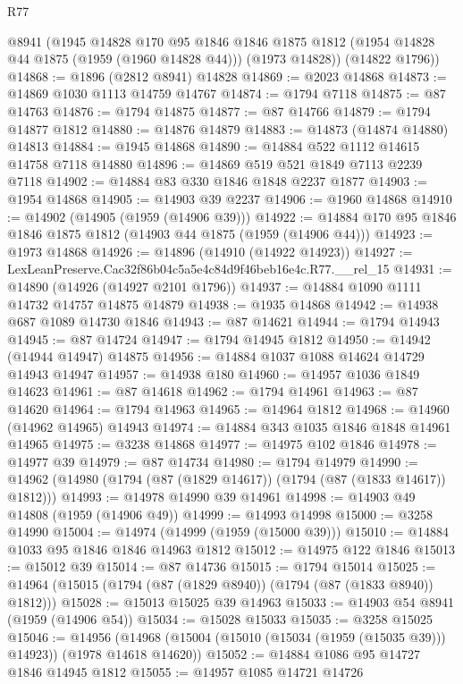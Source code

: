 \begin{lexlean}{R77}
\begin{coremodule}
      @8941
      (@1945
        @14828
        @170
        @95
        @1846
        @1846
        @1875
        @1812
        (@1954 @14828 @44 @1875 (@1959 (@1960 @14828 @44)))
        (@1973 @14828))
      (@14822 @1796))
@14868 := @1896 (@2812 @8941) @14828
@14869 := @2023 @14868
@14873 := @14869 @1030 @1113 @14759 @14767
@14874 := @1794 @7118
@14875 := @87 @14763
@14876 := @1794 @14875
@14877 := @87 @14766
@14879 := @1794 @14877 @1812
@14880 := @14876 @14879
@14883 := @14873 (@14874 @14880) @14813
@14884 := @1945 @14868
@14890 := @14884 @522 @1112 @14615 @14758 @7118 @14880
@14896 := @14869 @519 @521 @1849 @7113 @2239 @7118
@14902 := @14884 @83 @330 @1846 @1848 @2237 @1877
@14903 := @1954 @14868
@14905 := @14903 @39 @2237
@14906 := @1960 @14868
@14910 := @14902 (@14905 (@1959 (@14906 @39)))
@14922 := @14884 @170 @95 @1846 @1846 @1875 @1812 (@14903 @44 @1875 (@1959 (@14906 @44)))
@14923 := @1973 @14868
@14926 := @14896 (@14910 (@14922 @14923))
@14927 := LexLeanPreserve.Cac32f86b04c5a5e4c84d9f46beb16e4c.R77.__rel_15
@14931 := @14890 (@14926 (@14927 @2101 @1796))
@14937 := @14884 @1090 @1111 @14732 @14757 @14875 @14879
@14938 := @1935 @14868
@14942 := @14938 @687 @1089 @14730 @1846
@14943 := @87 @14621
@14944 := @1794 @14943
@14945 := @87 @14724
@14947 := @1794 @14945 @1812
@14950 := @14942 (@14944 @14947) @14875
@14956 := @14884 @1037 @1088 @14624 @14729 @14943 @14947
@14957 := @14938 @180
@14960 := @14957 @1036 @1849 @14623
@14961 := @87 @14618
@14962 := @1794 @14961
@14963 := @87 @14620
@14964 := @1794 @14963
@14965 := @14964 @1812
@14968 := @14960 (@14962 @14965) @14943
@14974 := @14884 @343 @1035 @1846 @1848 @14961 @14965
@14975 := @3238 @14868
@14977 := @14975 @102 @1846
@14978 := @14977 @39
@14979 := @87 @14734
@14980 := @1794 @14979
@14990 := @14962 (@14980 (@1794 (@87 (@1829 @14617)) (@1794 (@87 (@1833 @14617)) @1812)))
@14993 := @14978 @14990 @39 @14961
@14998 := @14903 @49 @14808 (@1959 (@14906 @49))
@14999 := @14993 @14998
@15000 := @3258 @14990
@15004 := @14974 (@14999 (@1959 (@15000 @39)))
@15010 := @14884 @1033 @95 @1846 @1846 @14963 @1812
@15012 := @14975 @122 @1846
@15013 := @15012 @39
@15014 := @87 @14736
@15015 := @1794 @15014
@15025 := @14964 (@15015 (@1794 (@87 (@1829 @8940)) (@1794 (@87 (@1833 @8940)) @1812)))
@15028 := @15013 @15025 @39 @14963
@15033 := @14903 @54 @8941 (@1959 (@14906 @54))
@15034 := @15028 @15033
@15035 := @3258 @15025
@15046 := @14956
    (@14968 (@15004 (@15010 (@15034 (@1959 (@15035 @39))) @14923)) (@1978 @14618 @14620))
@15052 := @14884 @1086 @95 @14727 @1846 @14945 @1812
@15055 := @14957 @1085 @14721 @14726

\end{coremodule}
\end{lexlean}
